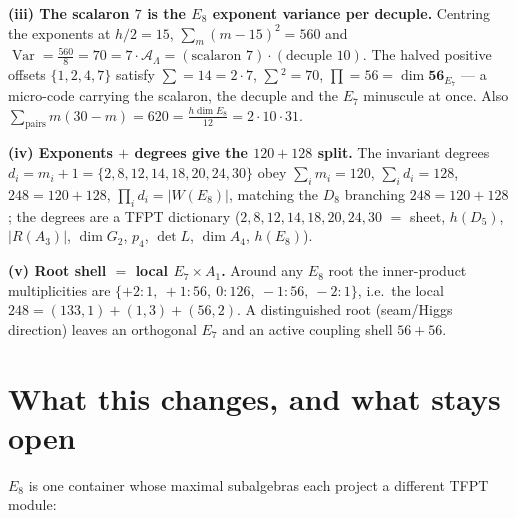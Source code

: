 \documentclass[11pt,a4paper]{article}
\newcommand{\AL}{\mathcal A_\Lambda}
\theoremstyle{definition}
\begin{document}
\par\smallskip\noindent\textbf{(iii) The scalaron $7$ is the $E_8$ exponent variance per decuple.}
Centring the exponents at $h/2=15$, $\sum_m(m-15)^2=560$ and
$\operatorname{Var}=\tfrac{560}{8}=70=7\cdot\AL=(\text{scalaron }7)\cdot(\text{decuple }10)$.
The halved positive offsets $\{1,2,4,7\}$ satisfy $\sum=14=2\cdot7$, $\sum{}^2=70$, $\prod=56=\dim\mathbf{56}_{E_7}$
--- a micro-code carrying the scalaron, the decuple and the $E_7$ minuscule at once.
Also $\sum_{\text{pairs}}m(30-m)=620=\tfrac{h\dim E_8}{12}=2\cdot10\cdot31$. \mE

\par\smallskip\noindent\textbf{(iv) Exponents $+$ degrees give the $120{+}128$ split.}
The invariant degrees $d_i=m_i+1=\{2,8,12,14,18,20,24,30\}$ obey
$\sum_i m_i=120$, $\sum_i d_i=128$, $248=120+128$, $\prod_i d_i=|W(E_8)|$,
matching the $D_8$ branching $248=120+128$; the degrees are a TFPT dictionary
($2,8,12,14,18,20,24,30$ $=$ sheet, $h(D_5)$, $|R(A_3)|$, $\dim G_2$, $p_4$, $\det L$, $\dim A_4$, $h(E_8)$). \mE

\par\smallskip\noindent\textbf{(v) Root shell $=$ local $E_7\times A_1$.}
Around any $E_8$ root the inner-product multiplicities are
$\{+2{:}1,\ +1{:}56,\ 0{:}126,\ -1{:}56,\ -2{:}1\}$, i.e.\ the local
$248=(133,1){+}(1,3){+}(56,2)$. A distinguished root (seam/Higgs direction) leaves an orthogonal $E_7$
and an active coupling shell $56{+}56$. \mE

\section{What this changes, and what stays open}
$E_8$ is one container whose maximal subalgebras each project a different TFPT module:
\end{document}
